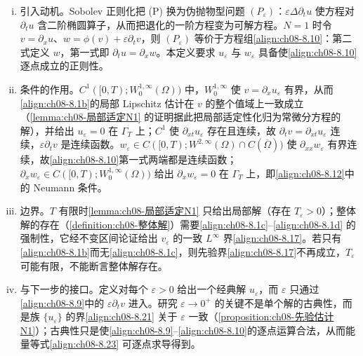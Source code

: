 \documentclass[../../main.tex]{subfiles}%
\begin{document}
\begin{remark}\label{remark:ch08-正则化解N1}
\begin{enumerate}[(i)]
\item 引入动机。Sobolev 正则化把 (P) 换为伪抛物型问题 $(P_\varepsilon)$：$\varepsilon\Delta\partial_t u$ 使方程对 $\partial_t u$ 含二阶椭圆算子，从而把退化的一阶方程变为可解方程。$N=1$ 时令 $v=\partial_x u$、$w=\phi(v)+\varepsilon\partial_t v$，则 $(P_\varepsilon)$ 等价于方程组\eqref{align:ch08-8.10}：第二式定义 $w$，第一式即 $\partial_t u=\partial_x w$。本定义要求 $u_\varepsilon$ 与 $w_\varepsilon$ 具备使\eqref{align:ch08-8.10}逐点成立的正则性。
\item 条件的作用。$C^1([0,T);W^{1,\infty}_0(\Omega))$ 中，$W^{1,\infty}_0$ 使 $v=\partial_x u_\varepsilon$ 有界，从而\eqref{align:ch08-8.1b}的局部 Lipschitz 估计在 $v$ 的整个值域上一致成立（\cref{lemma:ch08-局部适定N1} 的证明据此把局部适定性化归为常微分方程的解），并给出 $u_\varepsilon=0$ 在 $\Gamma_T$ 上；$C^1$ 使 $\partial_{xt}u_\varepsilon$ 存在且连续，故 $\partial_t v=\partial_{xt}u_\varepsilon$ 连续，$\varepsilon\partial_t v$ 是连续函数。$w_\varepsilon\in C([0,T);W^{2,\infty}(\Omega)\cap C(\overline\Omega))$ 使 $\partial_{xx}w_\varepsilon$ 有界连续，故\eqref{align:ch08-8.10}第一式两端都是连续函数；$\partial_x w_\varepsilon\in C([0,T);W^{1,\infty}_0(\Omega))$ 给出 $\partial_x w_\varepsilon=0$ 在 $\Gamma_T$ 上，即\eqref{align:ch08-8.12}中的 Neumann 条件。
\item 边界。$T$ 有限时\cref{lemma:ch08-局部适定N1} 只给出局部解（存在 $T_\varepsilon>0$）；整体解的存在（\cref{definition:ch08-整体解}）需要\eqref{align:ch08-8.1c}--\eqref{align:ch08-8.1d} 的强制性，它经不变区间论证给出 $v_\varepsilon$ 的一致 $L^\infty$ 界\eqref{align:ch08-8.17}。若只有\eqref{align:ch08-8.1b}而无\eqref{align:ch08-8.1c}，则先验界\eqref{align:ch08-8.17}不再成立，$T_\varepsilon$ 可能有限，不能断言整体解存在。
\item 与下一步的接口。定义对每个 $\varepsilon>0$ 给出一个经典解 $u_\varepsilon$，而 $\varepsilon$ 只通过\eqref{align:ch08-8.9}中的 $\varepsilon\partial_t v$ 进入。研究 $\varepsilon\to0^+$ 的关键不是单个解的古典性，而是族 $\{u_\varepsilon\}$ 的界\eqref{align:ch08-8.21} 关于 $\varepsilon$ 一致（\cref{proposition:ch08-先验估计N1}）；古典性只是使\eqref{align:ch08-8.9}--\eqref{align:ch08-8.10}的逐点运算合法，从而能量等式\eqref{align:ch08-8.23} 可逐点求导得到。
\end{enumerate}
\end{remark}
\end{document}
